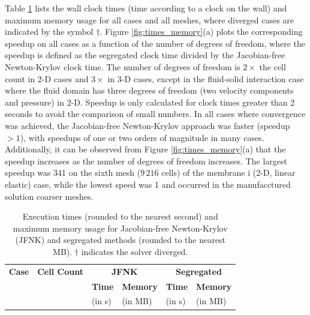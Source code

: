 \documentclass[sn-mathphys,Numbered]{sn-jnl}%
\begin{document}
Table \ref{tab:times_memory} lists the wall clock times (time according to a clock on the wall) and maximum memory usage for all cases and all meshes, where diverged cases are indicated by the symbol $\dag$.
Figure \ref{fig:times_memory}(a) plots the corresponding speedup on all cases as a function of the number of degrees of freedom, where the speedup is defined as the segregated clock time divided by the Jacobian-free Newton-Krylov clock time.
The number of degrees of freedom is $2 \times$ the cell count in 2-D cases and $3 \times$ in 3-D cases, except in the fluid-solid interaction case where the fluid domain has three degrees of freedom (two velocity components and pressure) in 2-D.
Speedup is only calculated for clock times greater than 2 seconds to avoid the comparison of small numbers.
In all cases where convergence was achieved, the Jacobian-free Newton-Krylov approach was faster (speedup $> 1$), with speedups of one or two orders of magnitude in many cases.
Additionally, it can be observed from Figure \ref{fig:times_memory}(a) that the speedup increases as the number of degrees of freedom increases.
The largest speedup was 341 on the sixth mesh ($9\,216$ cells) of the membrane i (2-D, linear elastic) case, while the lowest speed was 1 and occurred in the manufacctured solution coarser meshes.
\begin{table}[!htbp]
	\centering
		\begin{tabular}{ll|ll|ll}
			\hline
			\textbf{Case} & \textbf{Cell Count} & \multicolumn{2}{c|}{\textbf{JFNK}} & \multicolumn{2}{c}{\textbf{Segregated}} \\
			     &            & \textbf{Time} & \textbf{Memory} & \textbf{Time} & \textbf{Memory} \\
			     &            & (in s) & (in MB) & (in s) & (in MB) \\
			\hline
			
			
			
%			
			
			
			
			
			
%			
			
		\end{tabular}
	\caption{Execution times (rounded to the nearest second) and maximum memory usage for Jacobian-free Newton-Krylov (JFNK) and segregated methods (rounded to the nearest MB). $\dag$ indicates the solver diverged. }
	\label{tab:times_memory}
\end{table}
\end{document}
